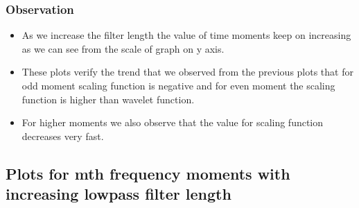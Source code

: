 \documentclass{article}
\begin{document}
\subsubsection{Observation}
\begin{itemize}
\item As we increase the filter length the value of time moments keep on increasing as we can see from the scale of graph on y axis.
\item These plots verify the trend that we observed from the previous plots that for odd moment scaling function is negative and for even moment the scaling function is higher than wavelet function.
\item For higher moments we also observe that the value for scaling function decreases very fast.
\end{itemize}

\subsection{Plots for mth frequency moments with increasing lowpass filter length}

\begin{figure}[H]
    \centering
    \qquad
    \label{fig:example}%
\end{figure}
\end{document}
